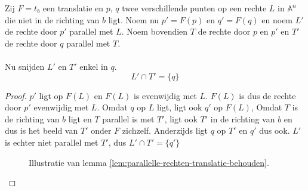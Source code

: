 \documentclass[main.tex]{subfiles}
\begin{document}
\begin{lem}
  \label{lem:parallelle-rechten-translatie-behouden}
  Zij $F = t_{b}$ een translatie en $p$, $q$ twee verschillende punten op een rechte $L$ in $\mathbb{A}^{n}$ die niet in de richting van $b$ ligt.
  Noem nu $p' = F(p)$ en $q'= F(q)$ en noem $L'$ de rechte door $p'$ parallel met $L$.
  Noem bovendien $T$ de rechte door $p$ en $p'$ en $T'$ de rechte door $q$ parallel met $T$.\\\\
  Nu snijden $L'$ en $T'$ enkel in $q$.
  \[ L' \cap T' = \{q\} \]

  \begin{proof}
    $p'$ ligt op $F(L)$ en $F(L)$ is evenwijdig met $L$.
    $F(L)$ is dus de rechte door $p'$ evenwijdig met $L$.
    Omdat $q$ op $L$ ligt, ligt ook $q'$ op $F(L)$,
    Omdat $T$ is de richting van $b$ ligt en $T$ parallel is met $T'$, ligt ook $T'$ in de richting van $b$ en dus is het beeld van $T'$ onder $F$ zichzelf.
    Anderzijds ligt $q$ op $T'$ en $q'$ dus ook.
    $L'$ is echter niet parallel met $T'$, dus $L' \cap T' = \{ q' \}$ 
    \begin{figure}[H]
      \centering
      \caption{Illustratie van lemma \ref{lem:parallelle-rechten-translatie-behouden}.}
      \label{fig:parallelle-rechten-translatie-behouden}
    \end{figure}    
  \end{proof}
\end{lem}
\end{document}
